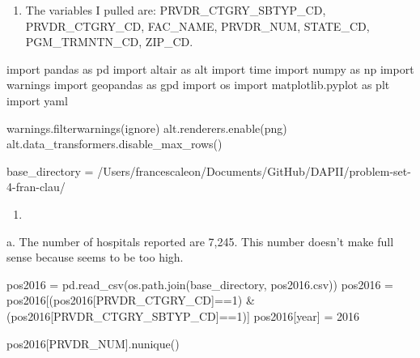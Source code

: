 \documentclass[
  letterpaper,
  DIV=11,
  numbers=noendperiod]{scrartcl}
\newenvironment{Shaded}{\begin{snugshade}}{\end{snugshade}}
\newcommand{\DecValTok}[1]{\textcolor[rgb]{0.68,0.00,0.00}{#1}}
\newcommand{\ImportTok}[1]{\textcolor[rgb]{0.00,0.46,0.62}{#1}}
\newcommand{\NormalTok}[1]{\textcolor[rgb]{0.00,0.23,0.31}{#1}}
\newcommand{\OperatorTok}[1]{\textcolor[rgb]{0.37,0.37,0.37}{#1}}
\newcommand{\StringTok}[1]{\textcolor[rgb]{0.13,0.47,0.30}{#1}}
\providecommand{\tightlist}{%
  \setlength{\itemsep}{0pt}\setlength{\parskip}{0pt}}\usepackage{longtable,booktabs,array}
\begin{document}
\begin{enumerate}
\def\labelenumi{\arabic{enumi}.}
\tightlist
\item
  The variables I pulled are: PRVDR\_CTGRY\_SBTYP\_CD, PRVDR\_CTGRY\_CD,
  FAC\_NAME, PRVDR\_NUM, STATE\_CD, PGM\_TRMNTN\_CD, ZIP\_CD.
\end{enumerate}

\begin{Shaded}
\begin{Highlighting}[]
\ImportTok{import}\NormalTok{ pandas }\ImportTok{as}\NormalTok{ pd}
\ImportTok{import}\NormalTok{ altair }\ImportTok{as}\NormalTok{ alt}
\ImportTok{import}\NormalTok{ time}
\ImportTok{import}\NormalTok{ numpy }\ImportTok{as}\NormalTok{ np}
\ImportTok{import}\NormalTok{ warnings}
\ImportTok{import}\NormalTok{ geopandas }\ImportTok{as}\NormalTok{ gpd}
\ImportTok{import}\NormalTok{ os}
\ImportTok{import}\NormalTok{ matplotlib.pyplot }\ImportTok{as}\NormalTok{ plt}
\ImportTok{import}\NormalTok{ yaml}

\NormalTok{warnings.filterwarnings(}\StringTok{\textquotesingle{}ignore\textquotesingle{}}\NormalTok{)}
\NormalTok{alt.renderers.enable(}\StringTok{\textquotesingle{}png\textquotesingle{}}\NormalTok{)}
\NormalTok{alt.data\_transformers.disable\_max\_rows()}

\NormalTok{base\_directory }\OperatorTok{=} \StringTok{\textquotesingle{}/Users/francescaleon/Documents/GitHub/DAPII/problem{-}set{-}4{-}fran{-}clau/\textquotesingle{}}
\end{Highlighting}
\end{Shaded}

\begin{enumerate}
\def\labelenumi{\arabic{enumi}.}
\setcounter{enumi}{1}
\tightlist
\item
\end{enumerate}

\hfill\break
a. The number of hospitals reported are 7,245. This number doesn't make
full sense because seems to be too high.

\begin{Shaded}
\begin{Highlighting}[]
\NormalTok{pos2016 }\OperatorTok{=}\NormalTok{ pd.read\_csv(os.path.join(base\_directory, }\StringTok{\textquotesingle{}pos2016.csv\textquotesingle{}}\NormalTok{))}
\NormalTok{pos2016 }\OperatorTok{=}\NormalTok{ pos2016[(pos2016[}\StringTok{\textquotesingle{}PRVDR\_CTGRY\_CD\textquotesingle{}}\NormalTok{]}\OperatorTok{==}\DecValTok{1}\NormalTok{) }\OperatorTok{\&}\NormalTok{ (pos2016[}\StringTok{\textquotesingle{}PRVDR\_CTGRY\_SBTYP\_CD\textquotesingle{}}\NormalTok{]}\OperatorTok{==}\DecValTok{1}\NormalTok{)]}
\NormalTok{pos2016[}\StringTok{\textquotesingle{}year\textquotesingle{}}\NormalTok{] }\OperatorTok{=} \DecValTok{2016}

\NormalTok{pos2016[}\StringTok{\textquotesingle{}PRVDR\_NUM\textquotesingle{}}\NormalTok{].nunique()}
\end{Highlighting}
\end{Shaded}
\end{document}

